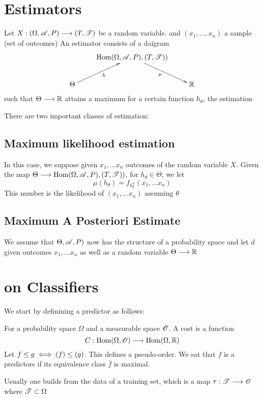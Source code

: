 \section{Estimators}

\begin{definition}
Let $X:(\Omega,\r{A},P)\mor (T,\r{T})$ be a random variable. and $(x_1,\ldots , x_n)$ a sample (set of outcomes) An estimator consists of a daigram
\begin{displaymath}
\xymatrix{
&  \Hom(\Omega,\r{A},P), (T,\r{T}))\ar[dr]_\mu\\
\Theta\ar[ur]_h & & \d{R}
}	
\end{displaymath}
such that $\Theta\longrightarrow \mathbb{R}$ attains a maximum for a certain function $h_\theta$, the estimation
\end{definition}


There are two important classes of estimation:

\subsection{Maximum likelihood estimation}
 In this case, we suppose given $x_1,\dots x_n$ outcomes of the random variable $X$. Given the map $\Theta \mor \Hom(\Omega,\r{A},P), (T,\r{T}))$, for $h_\theta \in \Theta$, we let \[\mu(h_\theta)=f_{h_\theta^n}(x_1,\ldots x_n)\]
 This number is the likelihood of $(x_1,\ldots x_n)$ assuming $\theta$
 
 \subsection{Maximum A Posteriori Estimate}
 We assume that $\Theta,\r{A},P)$ now has the structure of a probability space and let $ d$ given outcomes $x_1,\ldots x_n$ as well as a random variable $\Theta\longrightarrow \mathbb{R}$
\section{on Classifiers}

We start by definining a predictor as follows:
\begin{definition}
For a probability space $\Omega$ and a measurable space $\r{O}$. A cost is a function
\[
C:\Hom(\Omega,\r{O}) \mor \Hom(\Omega,\d{R})
\]	
Let $f\le g \iff \c(f)\le \c(g)$. This defines a pseudo-order. We sat that $f$ is a predictors if its equivalence class $\bar{f}$ is maximal.
\end{definition}

Usually one builds from the data of a training set, which is a map $\tau: \r{T}\mor \r{O}$ where $\r{T}\subset \Omega$

